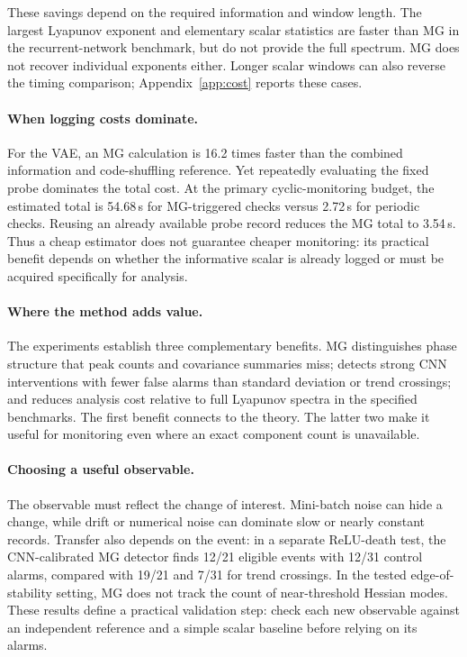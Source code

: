 {These savings depend on the required information and window length. The largest Lyapunov exponent and elementary scalar statistics are faster than MG in the recurrent-network benchmark, but do not provide the full spectrum. MG does not recover individual exponents either. Longer scalar windows can also reverse the timing comparison; Appendix~\ref{app:cost} reports these cases.

\paragraph{When logging costs dominate.}
For the VAE, an MG calculation is 16.2 times faster than the combined information and code-shuffling reference. Yet repeatedly evaluating the fixed probe dominates the total cost. At the primary cyclic-monitoring budget, the estimated total is 54.68\,s for MG-triggered checks versus 2.72\,s for periodic checks. Reusing an already available probe record reduces the MG total to 3.54\,s. Thus a cheap estimator does not guarantee cheaper monitoring: its practical benefit depends on whether the informative scalar is already logged or must be acquired specifically for analysis.

\paragraph{Where the method adds value.}
The experiments establish three complementary benefits. MG distinguishes phase structure that peak counts and covariance summaries miss; detects strong CNN interventions with fewer false alarms than standard deviation or trend crossings; and reduces analysis cost relative to full Lyapunov spectra in the specified benchmarks. The first benefit connects to the theory. The latter two make it useful for monitoring even where an exact component count is unavailable.

\paragraph{Choosing a useful observable.}
The observable must reflect the change of interest. Mini-batch noise can hide a change, while drift or numerical noise can dominate slow or nearly constant records. Transfer also depends on the event: in a separate ReLU-death test, the CNN-calibrated MG detector finds 12/21 eligible events with 12/31 control alarms, compared with 19/21 and 7/31 for trend crossings. In the tested edge-of-stability setting, MG does not track the count of near-threshold Hessian modes. These results define a practical validation step: check each new observable against an independent reference and a simple scalar baseline before relying on its alarms.

}
